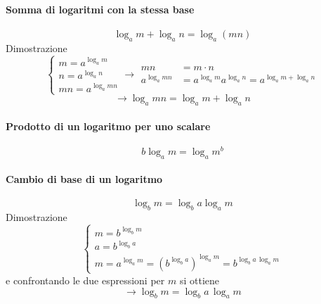 \paragraph{Somma di logaritmi con la stessa base}
\begin{equation}
  \log_a m + \log_a n = \log_a (mn)
\end{equation}
Dimostrazione
\begin{equation}
\begin{cases}
  m = a^{\log_a m} \\
  n = a^{\log_a n} \\
  mn = a^{\log_a mn}
\end{cases}
\rightarrow
\begin{aligned}
    mn & = m \cdot n \\
    a^{\log_a mn} & = a^{\log_a m} a^{\log_a n} = a^{\log_a m + \log_a n}
\end{aligned}
\end{equation}
\begin{equation}
  \rightarrow \log_a mn = \log_a m + \log_a n
\end{equation}
\paragraph{Prodotto di un logaritmo per uno scalare}
\begin{equation}
  b \log_a m = \log_a m^{b}
\end{equation}
\paragraph{Cambio di base di un logaritmo}
\begin{equation}
     \log_b m = \log_b a \log_a m 
\end{equation}
Dimostrazione
\begin{equation}
\begin{cases}
    m = b^{\log_b m} \\
    a = b^{\log_b a} \\
    m = a^{\log_a m} = \left( b^{\log_b a} \right)^{\log_a m} = b^{\log_b a \, \log_a m}
\end{cases}
\end{equation}
e confrontando le due espressioni per $m$ si ottiene
\begin{equation}
    \rightarrow \log_b m = \log_b a \, \log_a m
\end{equation}

